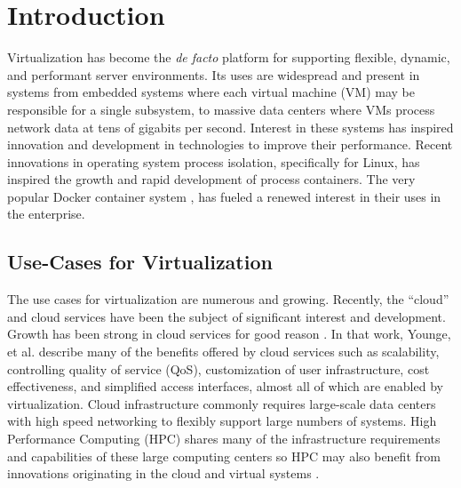\chapter{Introduction}
\label{sec:introduction}
Virtualization has become the \emph{de facto} platform for supporting flexible, dynamic, and performant server environments.  
Its uses are widespread and present in systems from embedded systems where each virtual machine (VM) may be responsible for a single subsystem, to massive data centers where VMs process network data at tens of gigabits per second.
Interest in these systems has inspired innovation and development in technologies to improve their performance.
Recent innovations in operating system process isolation, specifically for Linux, has inspired the growth and rapid development of process containers.
The very popular Docker container system \autocite{dockerdotcom}, has fueled a renewed interest in their uses in the enterprise.

\section{Use-Cases for Virtualization} %
\label{sec:introusecasesvt}
The use cases for virtualization are numerous and growing. 
Recently, the ``cloud'' and cloud services have been the subject of significant interest and development.
Growth has been strong in cloud services for good reason \autocite{_younge_1}.
In that work, Younge, et al. describe many of the benefits offered by cloud services such as scalability, controlling quality of service (QoS), customization of user infrastructure, cost effectiveness, and simplified access interfaces, almost all of which are enabled by virtualization.  
Cloud infrastructure commonly requires large-scale data centers with high speed networking to flexibly support large numbers of systems.  
High Performance Computing (HPC) shares many of the infrastructure requirements and capabilities of these large computing centers so HPC may also benefit from innovations originating in the cloud and virtual systems \autocite{xavier2013performance, _younge_1}.

